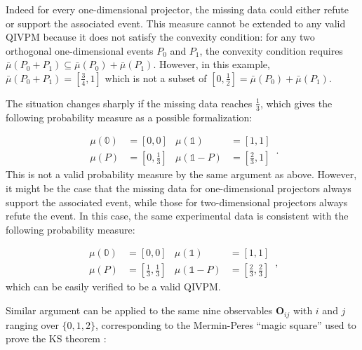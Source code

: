 \documentclass[english,reprint, aps, prl,superscriptaddress, showpacs,
showkeys, longbibliography, amsmath, amssymb, floatfix]{revtex4-1}
\theoremstyle{plain}
\theoremstyle{definition}
\newcommand{\imposs}{\ensuremath{\left[0,0\right]}}
\newcommand{\necess}{\ensuremath{\left[1,1\right]}}
\begin{document}
\noindent Indeed for every one-dimensional projector, the missing
data could either refute or support the associated event. This measure
cannot be extended to any valid QIVPM because it does not satisfy
the convexity condition: for any two orthogonal one-dimensional events
$P_{0}$ and $P_{1}$, the convexity condition requires$\bar{\mu}\left(P_{0}+P_{1}\right)\subseteq\bar{\mu}\left(P_{0}\right)+\bar{\mu}\left(P_{1}\right)$.
However, in this example, $\bar{\mu}\left(P_{0}+P_{1}\right)=\left[\tfrac{3}{4},1\right]$
which is not a subset of $\left[0,\tfrac{1}{2}\right]=\bar{\mu}\left(P_{0}\right)+\bar{\mu}\left(P_{1}\right)$.

The situation changes sharply if the missing data reaches $\frac{1}{3}$,
which gives the following probability measure as a possible formalization:

\begin{equation}
\begin{aligned}\mu\left(\mathbb{0}\right) & =\imposs & \mu\left(\mathbb{1}\right) & =\necess\\
\mu\left(P\right) & =\left[0,\tfrac{1}{3}\right] & \mu\left(\mathbb{1}-P\right) & =\left[\tfrac{2}{3},1\right]
\end{aligned}
\,.
\end{equation}
This is not a valid probability measure by the same argument as above.
However, it might be the case that the missing data for one-dimensional
projectors always support the associated event, while those for two-dimensional
projectors always refute the event. In this case, the same experimental
data is consistent with the following probability measure:

\begin{equation}
\begin{aligned}\mu\left(\mathbb{0}\right) & =\imposs & \mu\left(\mathbb{1}\right) & =\necess\\
\mu\left(P\right) & =\left[\tfrac{1}{3},\tfrac{1}{3}\right] & \mu\left(\mathbb{1}-P\right) & =\left[\tfrac{2}{3},\tfrac{2}{3}\right]
\end{aligned}
\,,
\end{equation}
which can be easily verified to be a valid QIVPM.

Similar argument can be applied to the same nine observables $\mathbf{O}_{ij}$
with $i$ and $j$ ranging over $\{0,1,2\}$, corresponding to the
Mermin-Peres ``magic square'' used to prove the KS theorem \cite{Mermin1990Simple,peres1995quantum,Griffiths2003}:
\end{document}
